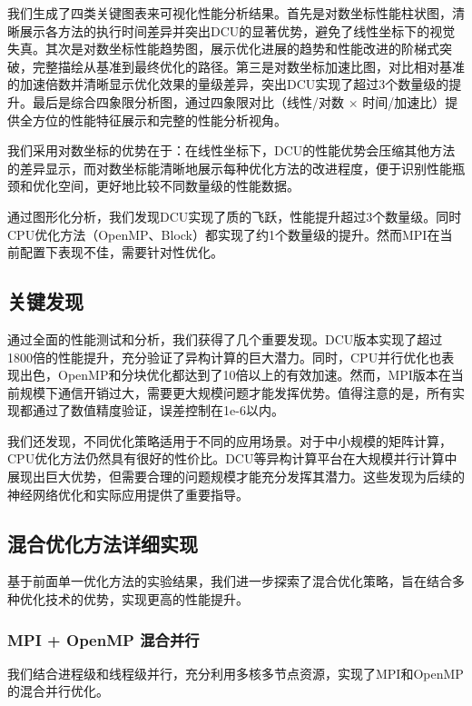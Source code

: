\documentclass[12pt,a4paper]{article}
\begin{document}
我们生成了四类关键图表来可视化性能分析结果。首先是对数坐标性能柱状图，清晰展示各方法的执行时间差异并突出DCU的显著优势，避免了线性坐标下的视觉失真。其次是对数坐标性能趋势图，展示优化进展的趋势和性能改进的阶梯式突破，完整描绘从基准到最终优化的路径。第三是对数坐标加速比图，对比相对基准的加速倍数并清晰显示优化效果的量级差异，突出DCU实现了超过3个数量级的提升。最后是综合四象限分析图，通过四象限对比（线性/对数 × 时间/加速比）提供全方位的性能特征展示和完整的性能分析视角。

我们采用对数坐标的优势在于：在线性坐标下，DCU的性能优势会压缩其他方法的差异显示，而对数坐标能清晰地展示每种优化方法的改进程度，便于识别性能瓶颈和优化空间，更好地比较不同数量级的性能数据。

通过图形化分析，我们发现DCU实现了质的飞跃，性能提升超过3个数量级。同时CPU优化方法（OpenMP、Block）都实现了约1个数量级的提升。然而MPI在当前配置下表现不佳，需要针对性优化。

\subsection{关键发现}

通过全面的性能测试和分析，我们获得了几个重要发现。DCU版本实现了超过1800倍的性能提升，充分验证了异构计算的巨大潜力。同时，CPU并行优化也表现出色，OpenMP和分块优化都达到了10倍以上的有效加速。然而，MPI版本在当前规模下通信开销过大，需要更大规模问题才能发挥优势。值得注意的是，所有实现都通过了数值精度验证，误差控制在1e-6以内。

我们还发现，不同优化策略适用于不同的应用场景。对于中小规模的矩阵计算，CPU优化方法仍然具有很好的性价比。DCU等异构计算平台在大规模并行计算中展现出巨大优势，但需要合理的问题规模才能充分发挥其潜力。这些发现为后续的神经网络优化和实际应用提供了重要指导。

\subsection{混合优化方法详细实现}

基于前面单一优化方法的实验结果，我们进一步探索了混合优化策略，旨在结合多种优化技术的优势，实现更高的性能提升。

\subsubsection{MPI + OpenMP 混合并行}

我们结合进程级和线程级并行，充分利用多核多节点资源，实现了MPI和OpenMP的混合并行优化。
\end{document}
